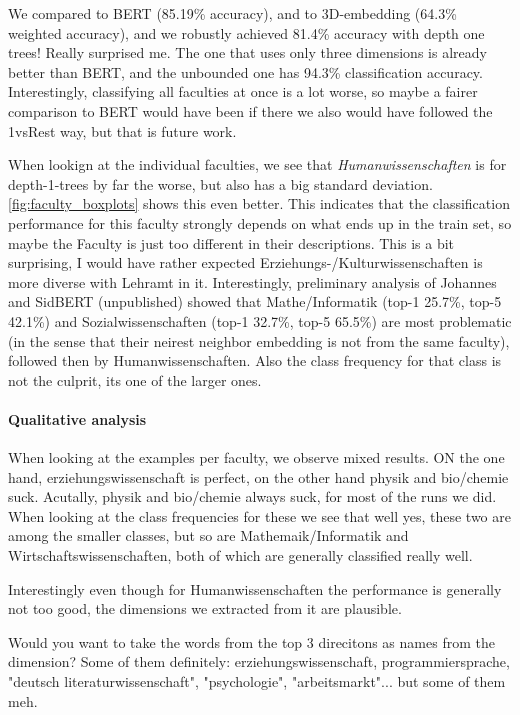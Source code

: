 We compared to BERT (85.19\% accuracy), and to 3D-embedding (64.3\% weighted accuracy), and we robustly achieved 81.4\% accuracy with depth one trees! Really surprised me. The one that uses only three dimensions is already better than BERT, and the unbounded one has 94.3\% classification accuracy. Interestingly, classifying all faculties at once is a lot worse, so maybe a fairer comparison to BERT would have been if there we also would have followed the 1vsRest way, but that is future work.

When lookign at the individual faculties, we see that \textit{Humanwissenschaften} is for depth-1-trees by far the worse, but also has a big standard deviation. \autoref{fig:faculty_boxplots} shows this even better. This indicates that the classification performance for this faculty strongly depends on what ends up in the train set, so maybe the Faculty is just too different in their descriptions. This is a bit surprising, I would have rather expected Erziehungs-/Kulturwissenschaften is more diverse with Lehramt in it.  Interestingly, preliminary analysis of Johannes and SidBERT (unpublished) showed that Mathe/Informatik (top-1 25.7\%, top-5 42.1\%) and Sozialwissenschaften (top-1 32.7\%, top-5 65.5\%) are most problematic (in the sense that their neirest neighbor embedding is not from the same faculty), followed then by Humanwissenschaften. Also the class frequency for that class is not the culprit, its one of the larger ones.

\paragraph{Qualitative analysis}

When looking at the examples per faculty, we observe mixed results. ON the one hand, erziehungswissenschaft is perfect, on the other hand physik and bio/chemie suck. Acutally, physik and bio/chemie always suck, for most of the runs we did. When looking at the class frequencies for these we see that well yes, these two are among the smaller classes, but so are Mathemaik/Informatik and Wirtschaftswissenschaften, both of which are generally classified really well.

Interestingly even though for Humanwissenschaften the performance is generally not too good, the dimensions we extracted from it are plausible.

Would you want to take the words from the top 3 direcitons as names from the dimension? Some of them definitely: erziehungswissenschaft, programmiersprache, "deutsch literaturwissenschaft", "psychologie", "arbeitsmarkt"... but some of them meh.


